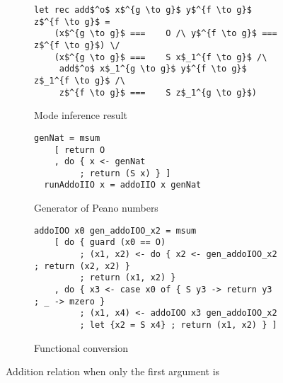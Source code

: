 \begin{figure}[h!]
  \centering
  \begin{subfigure}[b]{0.45\textwidth}
    \begin{lstlisting}[frame=tb]
  let rec add$^o$ x$^{g \to g}$ y$^{f \to g}$ z$^{f \to g}$ =
    (x$^{g \to g}$ ===    O /\ y$^{f \to g}$ ===    z$^{f \to g}$) \/
    (x$^{g \to g}$ ===    S x$_1^{f \to g}$ /\
     add$^o$ x$_1^{g \to g}$ y$^{f \to g}$ z$_1^{f \to g}$ /\
     z$^{f \to g}$ ===    S z$_1^{g \to g}$)
    \end{lstlisting}
   \caption{Mode inference result}
    \label{fig:addo_modded}
  \end{subfigure}
  \hfill
  \begin{subfigure}[b]{0.45\textwidth}
    \begin{lstlisting}[frame=tb]
  genNat = msum
    [ return O
    , do { x <- genNat
         ; return (S x) } ]
  runAddoIIO x = addoIIO x genNat
    \end{lstlisting}
   \caption{Generator of Peano numbers}
    \label{fig:addo_gen}
  \end{subfigure}

  \hfill

  \begin{subfigure}[b]{0.91\textwidth}
    \begin{lstlisting}[frame=tb]
  addoIOO x0 gen_addoIOO_x2 = msum
    [ do { guard (x0 == O)
         ; (x1, x2) <- do { x2 <- gen_addoIOO_x2 ; return (x2, x2) }
         ; return (x1, x2) }
    , do { x3 <- case x0 of { S y3 -> return y3 ; _ -> mzero }
         ; (x1, x4) <- addoIOO x3 gen_addoIOO_x2
         ; let {x2 = S x4} ; return (x1, x2) } ]
    \end{lstlisting}
    \caption{Functional conversion}
    \label{fig:addo_hsk}
  \end{subfigure}
  \caption{Addition relation when only the first argument is \inm}
  \label{fig:addo}
\end{figure}

